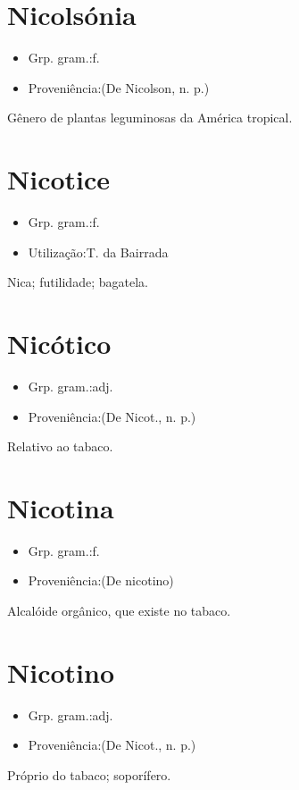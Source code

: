 \section{Nicolsónia}
\begin{itemize}
\item {Grp. gram.:f.}
\end{itemize}
\begin{itemize}
\item {Proveniência:(De \textunderscore Nicolson\textunderscore , n. p.)}
\end{itemize}
Gênero de plantas leguminosas da América tropical.
\section{Nicotice}
\begin{itemize}
\item {Grp. gram.:f.}
\end{itemize}
\begin{itemize}
\item {Utilização:T. da Bairrada}
\end{itemize}
Nica; futilidade; bagatela.
\section{Nicótico}
\begin{itemize}
\item {Grp. gram.:adj.}
\end{itemize}
\begin{itemize}
\item {Proveniência:(De \textunderscore Nicot.\textunderscore , n. p.)}
\end{itemize}
Relativo ao tabaco.
\section{Nicotina}
\begin{itemize}
\item {Grp. gram.:f.}
\end{itemize}
\begin{itemize}
\item {Proveniência:(De \textunderscore nicotino\textunderscore )}
\end{itemize}
Alcalóide orgânico, que existe no tabaco.
\section{Nicotino}
\begin{itemize}
\item {Grp. gram.:adj.}
\end{itemize}
\begin{itemize}
\item {Proveniência:(De \textunderscore Nicot.\textunderscore , n. p.)}
\end{itemize}
Próprio do tabaco; soporífero.

